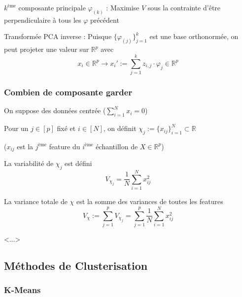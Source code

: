 \documentclass[12pt,a4paper]{article}
\begin{document}
$k^\text{ème}$ composante principale $\varphi_{(k)}$ : Maximise $V$ sous la contrainte d'être perpendiculaire à tous les $\varphi$ précédent

\medskip

Transformée PCA inverse : Puisque $\{\varphi_{(j)}\}_{j=1}^k$ est une base orthonormée, on peut projeter une valeur sur $\mathbb{R}^p$ avec
$$x_i \in \mathbb{R}^p \to x_i' := \sum_{j=1}^{k} z_{i,j} \cdot \varphi_j \in \mathbb{R}^p$$

\subsubsection{Combien de composante garder}

On suppose des données centrée ($\sum_{i=1}^N x_i = 0$)

Pour un $j \in [p]$ fixé et $i\in[N]$, on définit $\chi_j := \{x_{ij}\}_{i=1}^N \subset \mathbb{R}$

($x_{ij}$ est la $j^\text{ème}$ feature du $i^\text{ème}$ échantillon de $X \in \mathbb{R}^p$)

\smallskip

La variabilité de $\chi_j$ est défini
$$V_{\chi_j} = \frac{1}{N} \sum_{i=1}^N x_{ij}^2$$

La variance totale de $\chi$ est la somme des variances de toutes les features
$$V_\chi := \sum_{j=1}^p V_{\chi_j} = \sum_{j=1}^p \frac{1}{N} \sum_{i=1}^N x_{ij}^2$$

<...>

\subsection{Méthodes de Clusterisation}

\subsubsection{K-Means}
\end{document}
